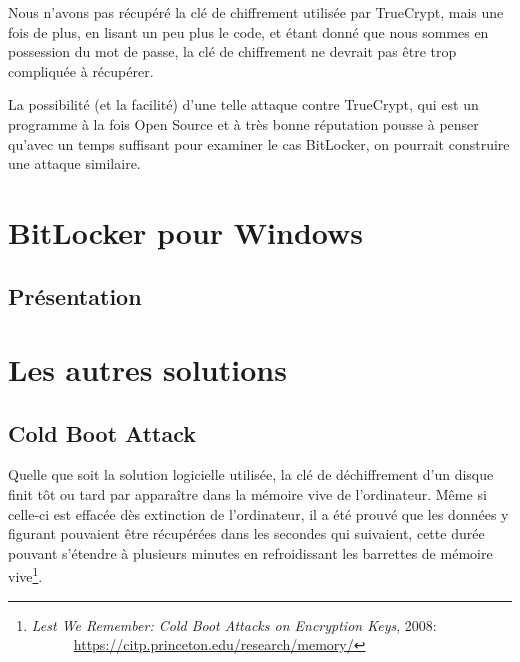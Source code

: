\documentclass[12pt,a4paper]{article}
\begin{document}
Nous n'avons pas récupéré la clé de chiffrement utilisée par TrueCrypt, mais une
fois de plus, en lisant un peu plus le code, et étant donné que nous sommes en 
possession du mot de passe, la clé de chiffrement ne devrait pas être trop 
compliquée à récupérer.

La possibilité (et la facilité) d'une telle attaque contre TrueCrypt, qui est un
programme à la fois Open Source et à très bonne réputation pousse à penser qu'avec
un temps suffisant pour examiner le cas BitLocker, on pourrait construire une
attaque similaire.


\clearpage
\section{BitLocker pour Windows}

\subsection{Présentation}



\clearpage
\section{Les autres solutions}

\subsection{Cold Boot Attack}

Quelle que soit la solution logicielle utilisée, la clé de déchiffrement d'un disque finit tôt ou tard par apparaître dans la mémoire vive de l'ordinateur. Même si celle-ci est effacée dès extinction de l'ordinateur, il a été prouvé que les données y figurant pouvaient être récupérées dans les secondes qui suivaient, cette durée pouvant s'étendre à plusieurs minutes en refroidissant les barrettes de mémoire vive\footnote{\textit{Lest We Remember: Cold Boot Attacks on Encryption Keys}, 2008:\\
~~~~~~\url{https://citp.princeton.edu/research/memory/}}.
\end{document}
